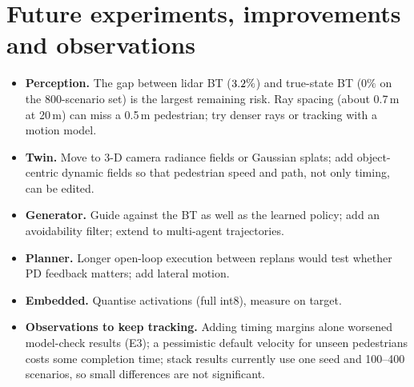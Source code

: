 \section{Future experiments, improvements and observations}
\begin{itemize}[leftmargin=*,itemsep=1pt]
\item \textbf{Perception.} The gap between lidar BT ($3.2\%$) and true-state BT ($0\%$ on the 800-scenario set) is the largest remaining risk. Ray spacing (about 0.7\,m at 20\,m) can miss a 0.5\,m pedestrian; try denser rays or tracking with a motion model.
\item \textbf{Twin.} Move to 3-D camera radiance fields or Gaussian splats; add object-centric dynamic fields so that pedestrian speed and path, not only timing, can be edited.
\item \textbf{Generator.} Guide against the BT as well as the learned policy; add an avoidability filter; extend to multi-agent trajectories.
\item \textbf{Planner.} Longer open-loop execution between replans would test whether PD feedback matters; add lateral motion.
\item \textbf{Embedded.} Quantise activations (full int8), measure on target.
\item \textbf{Observations to keep tracking.} Adding timing margins alone worsened model-check results (E3); a pessimistic default velocity for unseen pedestrians costs some completion time; stack results currently use one seed and 100--400 scenarios, so small differences are not significant.
\end{itemize}
